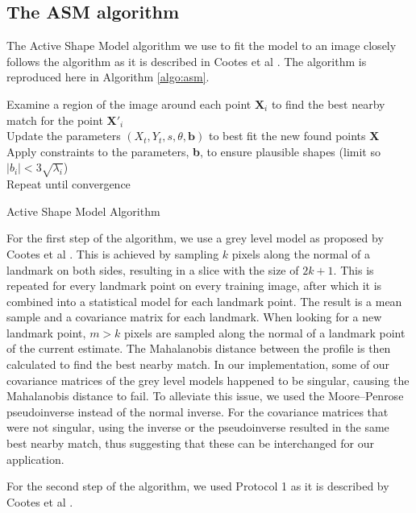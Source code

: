 \documentclass[a4paper,titlepage,12pt]{article}
\begin{document}
\subsection{The ASM algorithm}
\label{subsec:ASM}

The Active Shape Model algorithm we use to fit the model to an image closely follows the algorithm as it is described in Cootes et al \cite{cootes2000introduction}. The algorithm is reproduced here in Algorithm \ref{algo:asm}.

\begin{algorithm}
Examine a region of the image around each point {$\textbf{X}_i$} to find the best nearby match for the point $\textbf{X}'_i$\\
Update the parameters $(X_t,Y_t,s,\theta,\textbf{b})$ to best fit the new found points \textbf{X} \\
Apply constraints to the parameters, \textbf{b}, to ensure plausible shapes (limit so $| b_i | < 3 \sqrt{\lambda_i}$)  \\
Repeat until convergence
\caption{Active Shape Model Algorithm}
\label{algo:asm}
\end{algorithm}

For the first step of the algorithm, we use a grey level model as proposed by Cootes et al \cite{cootes2000introduction}.
This is achieved by sampling $k$ pixels along the normal of a landmark on both sides, resulting in a slice with the size of $2k + 1$. This is repeated for every landmark point on every training image, after which it is combined into a statistical model for each landmark point.
The result is a mean sample and a covariance matrix for each landmark.
When looking for a new landmark point, $m > k$ pixels are sampled along the normal of a landmark point of the current estimate.
The Mahalanobis distance between the profile is then calculated to find the best nearby match.
In our implementation, some of our covariance matrices of the grey level models happened to be singular, causing the Mahalanobis distance to fail.
To alleviate this issue, we used the Moore–Penrose pseudoinverse instead of the normal inverse.
For the covariance matrices that were not singular, using the inverse or the pseudoinverse resulted in the same best nearby match, thus suggesting that these can be interchanged for our application.

For the second step of the algorithm, we used Protocol 1 as it is described by Cootes et al \cite{cootes2000introduction}.
\end{document}
